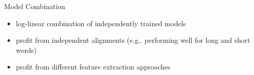 \documentclass[final,t]{beamer}
\makeatletter
\DeclareRobustCommand\onedot{\futurelet\@let@token\@onedot}
\def\@onedot{\ifx\@let@token.\else.\null\fi\xspace}
\def\eg{{e.g}\onedot} \def\Eg{{E.g}\onedot}
\makeatother
\begin{document}
\begin{frame}{}
\begin{columns}
    \begin{column}{.45\linewidth}
      \begin{block}{Model Combination}
            \begin{itemize}
            \item \alert{log-linear combination} of independently
              trained models
            \item profit from independent alignments (\eg performing
              well for long and short words)
            \item profit from different feature extraction approaches
            \end{itemize}
      \end{block}
    \end{column}
  \end{columns}   %

\end{frame}
\end{document}
